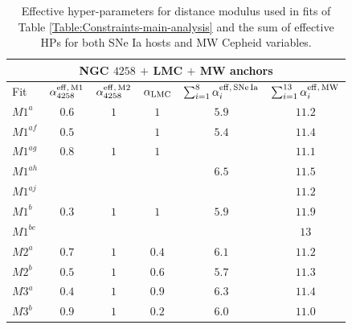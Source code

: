 \begin{table}[tbp]
\centering
\begin{tabular}{@{}lccccc}
\hline
\multicolumn{6}{c}{NGC $4258$ $+$ LMC $+$ MW anchors} \\
\hline
Fit & $\alpha_{4258}^{\mathrm{eff},\,\rm M1}$ & $\alpha_{4258}^{\mathrm{eff},\,\rm M2}$ & $\alpha_{\mathrm{LMC}}$ & $\sum_{i=1}^{8}  \alpha^{\mathrm{eff},\,\mathrm{SNe\,Ia}}_{i}$ &$\sum_{i=1}^{13} \alpha^{\mathrm{eff},\,\mathrm{MW}}_{i}$ \\
\hline
$M1^{a}$ & $ 0.6 $ & $ 1 $ & $ 1 $ & $ 5.9 $ & $ 11.2 $ \\
$M1^{af}$ & $ 0.5 $ & $ $ & $ 1 $ & $ 5.4 $ & $ 11.4 $ \\
$M1^{ag}$ & $ 0.8 $ & $ 1 $ & $ 1 $ & $ $ & $ 11.1 $ \\
$M1^{ah}$ & $ $ & $ $ & $ $ & $ 6.5 $ & $ 11.5 $ \\
$M1^{aj}$ & $ $ & $ $ & $ $ & $ $ & $ 11.2 $\\
$M1^{b}$ & $ 0.3 $ & $ 1 $ & $ 1 $ & $ 5.9 $ & $ 11.9 $ \\
$M1^{be}$ & $ $ & $ $ & $ $ & $ $ & $ 13 $ \\
$M2^{a}$ & $ 0.7 $ & $ 1 $ & $ 0.4  $ & $ 6.1 $ & $ 11.2$ \\
$M2^{b}$ & $ 0.5 $ & $ 1 $ & $ 0.6 $ & $ 5.7 $ & $ 11.3 $ \\
$M3^{a}$ & $ 0.4 $ & $ 1 $ & $ 0.9 $ & $ 6.3 $ & $ 11.4 $ \\
$M3^{b}$ & $ 0.9 $ & $ 1 $ & $ 0.2 $ & $ 6.0 $ & $ 11.0 $ \\
\hline
\end{tabular}
\caption{\label{Table:HPs-main-analysis-Table3} Effective hyper-parameters for distance modulus used in fits of Table \ref{Table:Constraints-main-analysis} and the sum of effective HPs for both SNe Ia hosts and MW Cepheid variables.%
}
\end{table}